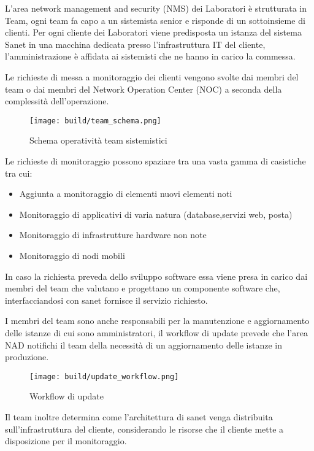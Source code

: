 L'area network management and security (NMS) dei Laboratori è strutturata in Team, ogni team fa capo a un sistemista senior e risponde di un sottoinsieme di clienti. Per ogni cliente dei Laboratori viene predisposta un istanza del sistema Sanet in una macchina dedicata presso l'infrastruttura IT del cliente, l'amministrazione è affidata ai sistemisti che ne hanno in carico la commessa.

Le richieste di messa a monitoraggio dei clienti vengono svolte dai membri del team o dai membri del Network Operation Center (NOC) a seconda della complessità dell'operazione.

\begin{figure}[H]
    \centering
    \texttt{[image: build/team\_schema.png]}
    \caption{Schema operatività team sistemistici}
    \label{fig:enter-label}
\end{figure}

Le richieste di monitoraggio possono spaziare tra una vasta gamma di casistiche tra cui:

\begin{itemize}
  \item{Aggiunta a monitoraggio di elementi nuovi elementi noti}
  \item{Monitoraggio di applicativi di varia natura (database,servizi web, posta)}
  \item{Monitoraggio di infrastrutture hardware non note}
  \item{Monitoraggio di nodi mobili}
\end{itemize}

In caso la richiesta preveda dello sviluppo software essa viene presa in carico dai membri del team che valutano e progettano un componente software che, interfacciandosi con sanet fornisce il servizio richiesto.

I membri del team sono anche responsabili per la manutenzione e aggiornamento delle istanze di cui sono amministratori, il workflow di update prevede che l'area NAD notifichi il team della necessità di un aggiornamento delle istanze in produzione.

\begin{figure}[H]
    \centering
    \texttt{[image: build/update\_workflow.png]}
    \caption{Workflow di update}
    \label{fig:enter-label}
\end{figure}

Il team inoltre determina come l'architettura di sanet venga distribuita sull'infrastruttura del cliente, considerando le risorse che il cliente mette a disposizione per il monitoraggio.

